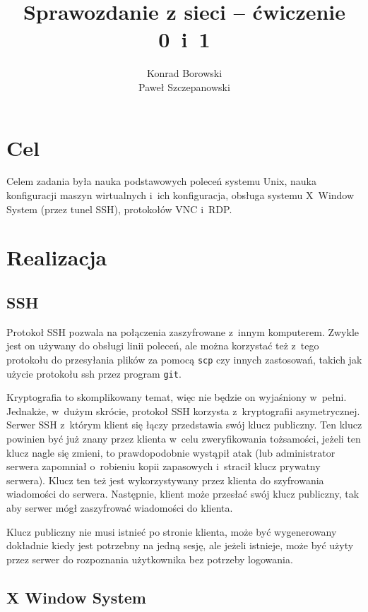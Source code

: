 \documentclass{article}
\title{Sprawozdanie z sieci -- ćwiczenie 0~i~1}
\author{Konrad Borowski\\Paweł Szczepanowski}
\begin{document}

\maketitle

\section{Cel}

Celem zadania była nauka podstawowych poleceń systemu Unix, nauka
konfiguracji maszyn wirtualnych i~ich konfiguracja, obsługa systemu
X~Window System (przez tunel SSH), protokołów VNC i~RDP.

\section{Realizacja}

\subsection{SSH}

Protokoł SSH pozwala na połączenia zaszyfrowane z~innym komputerem. Zwykle
jest on używany do obsługi linii poleceń, ale można korzystać też z~tego
protokołu do przesyłania plików za pomocą \verb|scp| czy innych zastosowań,
takich jak użycie protokołu ssh przez program \verb|git|.

Kryptografia to skomplikowany temat, więc nie będzie on wyjaśniony w~pełni.
Jednakże, w~dużym skrócie, protokoł SSH korzysta z~kryptografii asymetrycznej.
Serwer SSH z~którym klient się łączy przedstawia swój klucz publiczny. Ten
klucz powinien być już znany przez klienta w~celu zweryfikowania tożsamości,
jeżeli ten klucz nagle się zmieni, to prawdopodobnie wystąpił atak (lub
administrator serwera zapomniał o~robieniu kopii zapasowych i~stracił
klucz prywatny serwera). Klucz ten też jest wykorzystywany przez klienta
do szyfrowania wiadomości do serwera. Następnie, klient może przesłać swój
klucz publiczny, tak aby serwer mógł zaszyfrować wiadomości do klienta.

Klucz publiczny nie musi istnieć po stronie klienta, może być wygenerowany
dokładnie kiedy jest potrzebny na jedną sesję, ale jeżeli istnieje, może
być użyty przez serwer do rozpoznania użytkownika bez potrzeby logowania.

\subsection{X Window System}
\end{document}
